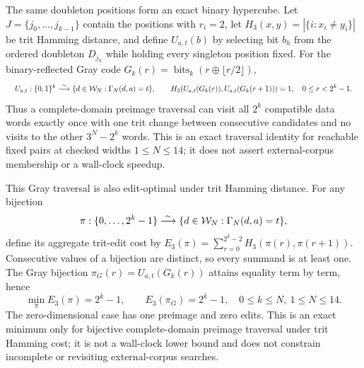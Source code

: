 \documentclass{article}
\newcommand{\fitmath}[1]{\resizebox{0.99\linewidth}{!}{$\displaystyle #1$}}
\begin{document}
The same doubleton positions form an exact binary hypercube. Let
$J=\{j_0,\ldots,j_{k-1}\}$ contain the positions with $r_i=2$, let
$H_3(x,y)=|\{i:x_i\neq y_i\}|$ be trit Hamming distance, and define
$U_{a,t}(b)$ by selecting bit $b_h$ from the ordered doubleton $D_{j_h}$ while
holding every singleton position fixed. For the binary-reflected Gray code
$G_k(r)=\operatorname{bits}_k(r\mathbin{\oplus}\lfloor r/2\rfloor)$,
\begin{equation}
  \fitmath{%
    U_{a,t}:\{0,1\}^k
      \overset{\sim}{\longrightarrow}
      \{d\in\WordDomain{N}:\CrazyN{N}{d}{a}=t\},
    \qquad
    H_3\!\left(U_{a,t}(G_k(r)),U_{a,t}(G_k(r+1))\right)=1,
    \quad 0\leq r<2^k-1.
  }
  \label{eq:optimization-crazy-profile-preimage-gray-enumeration}
\end{equation}
Thus a complete-domain preimage traversal can visit all $2^k$ compatible data
words exactly once with one trit change between consecutive candidates and no
visits to the other $3^N-2^k$ words. This is an exact traversal identity for
reachable fixed pairs at checked widths $1\leq N\leq14$; it does not assert
external-corpus membership or a wall-clock speedup.

This Gray traversal is also edit-optimal under trit Hamming distance. For any
bijection
\[
  \pi:\{0,\ldots,2^k-1\}
    \overset{\sim}{\longrightarrow}
    \{d\in\mathcal{W}_{N}:\Gamma_{N}\!\left(d,a\right)=t\},
\]
define its aggregate trit-edit cost by
$E_3(\pi)=\sum_{r=0}^{2^k-2}H_3(\pi(r),\pi(r+1))$. Consecutive values of a
bijection are distinct, so every summand is at least one. The Gray bijection
$\pi_G(r)=U_{a,t}(G_k(r))$ attains equality term by term, hence
\begin{equation}
  \min_{\pi}E_3(\pi)=2^k-1,
  \qquad
  E_3(\pi_G)=2^k-1,
  \quad 0\leq k\leq N,\ 1\leq N\leq14.
  \label{eq:optimization-crazy-profile-preimage-gray-optimality}
\end{equation}
The zero-dimensional case has one preimage and zero edits. This is an exact
minimum only for bijective complete-domain preimage traversal under trit Hamming
cost; it is not a wall-clock lower bound and does not constrain incomplete or
revisiting external-corpus searches.
\end{document}
